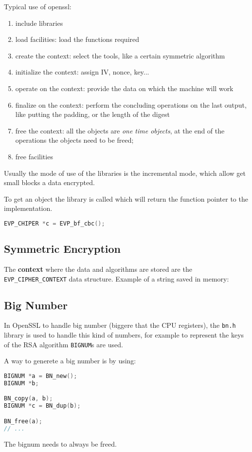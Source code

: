 \documentclass[12pt]{article}
\begin{document}
Typical use of openssl:
\begin{enumerate}
  \item include libraries
  \item load facilities: load the functions required
  \item create the context: select the tools, like a certain symmetric algorithm
  \item initialize the context: assign IV, nonce, key...
  \item operate on the context: provide the data on which the machine will work
  \item finalize on the context: perform the concluding operations on the last output, like putting the padding, or the length of the digest
  \item free the context: all the objects are \emph{one time objects}, at the end of the operations the objects need to be freed;
  \item free facilities
\end{enumerate}
Usually the mode of use of the libraries is the incremental mode, which allow get small blocks a data encrypted.

To get an object the library is called which will return the function pointer to the implementation.
\begin{lstlisting}[language=c]
EVP_CHIPER *c = EVP_bf_cbc();
\end{lstlisting}


\subsection{Symmetric Encryption}
The \textbf{context} where the data and algorithms are stored are the \texttt{EVP_CIPHER_CONTEXT} data structure. 
Example of a string saved in memory:


\subsection{Big Number}
In OpenSSL to handle big number (biggere that the CPU registers), the \texttt{bn.h} library is used to handle this kind of numbers, for example to represent the keys of the RSA algorithm \texttt{BIGNUM}s are used.

A way to generete a big number is by using:
\begin{lstlisting}[language=c]
BIGNUM *a = BN_new();
BIGNUM *b;

BN_copy(a, b);
BIGNUM *c = BN_dup(b);

BN_free(a);
// ...
\end{lstlisting}
The bignum needs to always be freed.
\end{document}
